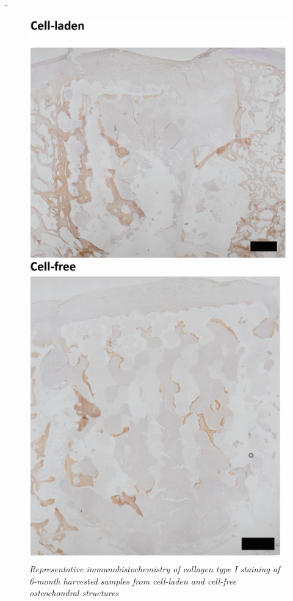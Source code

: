 \documentclass[twocolumn, empirical, authordate, issue]{jote-new-article}
\begin{document}
\begin{adjustwidth}{-\fullwidthlen}{}
\begin{figure}
\centering \includegraphics[width=.8\columnwidth]{media/image16_1.jpg}
\caption{\emph{Representative immunohistochemistry of collagen type I staining of 6-month harvested samples from cell-laden and cell-free osteochondral structures}}
\label{fig:sup5}\end{figure}


\end{adjustwidth}
\end{document}
